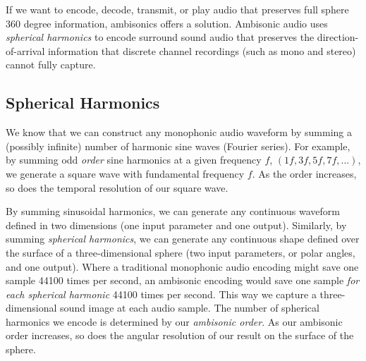 If we want to encode, decode, transmit, or play audio that preserves
full sphere 360 degree information, ambisonics offers a solution.
Ambisonic audio uses \textit{spherical harmonics} to encode surround
sound audio that preserves the direction-of-arrival information that
discrete channel recordings (such as mono and stereo) cannot fully
capture.

\subsection{Spherical Harmonics}
\label{sec:spherical-harmonics}
We know that we can construct any monophonic audio waveform by summing
a (possibly infinite) number of harmonic sine waves (Fourier
series).
For example, by summing odd \textit{order} sine harmonics at a given
frequency $f$, $(1f, 3f, 5f, 7f, \ldots )$, we generate a square wave
with fundamental frequency $f$. As the order increases, so does the
temporal resolution of our square wave.

By summing sinusoidal harmonics, we can generate any continuous
waveform defined in two dimensions (one input parameter and one
output). Similarly, by summing \emph{spherical harmonics}, we can
generate any continuous shape defined over the surface of a
three-dimensional sphere (two input parameters, or polar angles, and one
output). Where a traditional monophonic audio encoding might save one
sample 44100 times per second, an ambisonic encoding would save one
sample \emph{for each spherical harmonic} 44100 times per second. This
way we capture a three-dimensional sound image at each audio sample.
The number of spherical harmonics we encode is determined by our
\textit{ambisonic order}. As our ambisonic order increases, so does
the angular resolution of our result on the surface of the sphere.

